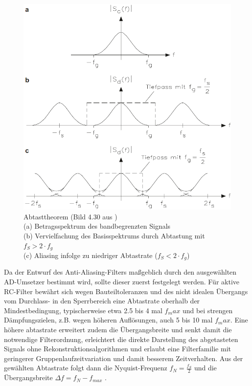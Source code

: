\documentclass[a4paper, portrait, 12pt]{scrartcl} %
\begin{document}
\begin{figure}[H]
	\centering
		\includegraphics[scale=0.5]{aaf_freq_domain_bernstein.png} 
		\caption{\centering Abtasttheorem (Bild 4.30 aus \cite[S. 314]{Bernstein2023})\\
			\footnotesize(a) Betragsspektrum des bandbegrenzten Signals\\
			(b) Vervielfachung des Basisspektrums durch Abtastung mit $f_S > 2\cdot f_g$\\
			(c) Aliasing infolge zu niedriger Abtastrate ($f_S < 2\cdot f_g$)
		}
	\label{fig:aaf_freq_domain}
\end{figure}

Da der Entwurf des Anti-Aliasing-Filters maßgeblich durch den ausgewählten AD-Umsetzer bestimmt wird, sollte dieser zuerst festgelegt werden. Für aktive RC-Filter bewährt sich wegen Bauteiltoleranzen und des nicht idealen Übergangs vom Durchlass- in den Sperrbereich eine Abtastrate oberhalb der Mindestbedingung, typischerweise etwa 2.5 bis 4 mal $f_max$ und bei strengen Dämpfungszielen, z.B. wegen höheren Auflösungen, auch 5 bis 10 mal $f_max$. Eine höhere abtastrate erweitert zudem die Übergangsbreite und senkt damit die notwendige Filterordnung, erleichtert die direkte Darstellung des abgetasteten Signals ohne Rekonstruktionsalgorithmen und erlaubt eine Filterfamilie mit geringerer Gruppenlaufzeitvariation und damit besserem Zeitverhalten. Aus der gewählten Abtastrate folgt dann die Nyquist-Frequenz $f_N = \frac{f_S}{2}$ und die Übergangsbreite $\Delta f = f_N - f_{max}$ \cite{Pini2020}.\\
\end{document}
